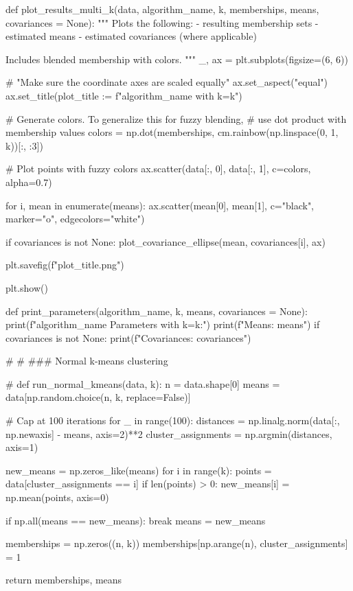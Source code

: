 \documentclass{article}
\begin{document}
{\begin{spverbatim}
def plot_results_multi_k(data, algorithm_name, k, memberships, means, covariances = None):
  """
  Plots the following:
  - resulting membership sets
  - estimated means
  - estimated covariances (where applicable)
  
  Includes blended membership with colors.
  """
  _, ax = plt.subplots(figsize=(6, 6))

  # "Make sure the coordinate axes are scaled equally"
  ax.set_aspect("equal")
  ax.set_title(plot_title := f"{algorithm_name} with k={k}")

  # Generate colors. To generalize this for fuzzy blending, 
  # use dot product with membership values
  colors = np.dot(memberships, cm.rainbow(np.linspace(0, 1, k))[:, :3])
  
  # Plot points with fuzzy colors
  ax.scatter(data[:, 0], data[:, 1], c=colors, alpha=0.7)
  
  for i, mean in enumerate(means):
    ax.scatter(mean[0], mean[1], c="black", marker="o", edgecolors="white")

    if covariances is not None:
        plot_covariance_ellipse(mean, covariances[i], ax)

  plt.savefig(f"{plot_title}.png")

  plt.show()

def print_parameters(algorithm_name, k, means, covariances = None):
    print(f"{algorithm_name} Parameters with k={k}:")
    print(f"Means: {means}")
    if covariances is not None:
       print(f"Covariances: {covariances}")

# %
# ### Normal k-means clustering

# %
def run_normal_kmeans(data, k):
  n = data.shape[0]
  means = data[np.random.choice(n, k, replace=False)]

  # Cap at 100 iterations
  for _ in range(100):
    distances = np.linalg.norm(data[:, np.newaxis] - means, axis=2)**2
    cluster_assignments = np.argmin(distances, axis=1)
    
    new_means = np.zeros_like(means)
    for i in range(k):
      points = data[cluster_assignments == i]
      if len(points) > 0:
        new_means[i] = np.mean(points, axis=0)
            
    if np.all(means == new_means):
      break
    means = new_means
      
  memberships = np.zeros((n, k))
  memberships[np.arange(n), cluster_assignments] = 1
  
  return memberships, means


\end{spverbatim}}
\end{document}
